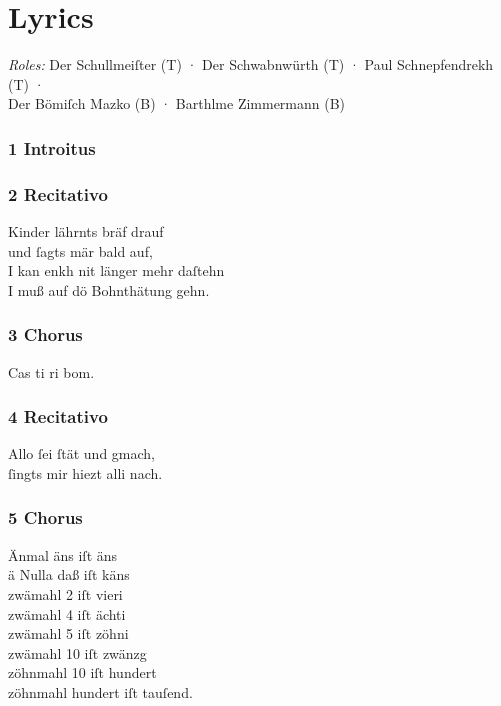 \documentclass{ees}
\newenvironment{lyrics}[1]{%
  \subsection{#1}\nopagebreak%
  \begin{lyricslist}%
  \let\voice\item%
}{%
  \end{lyricslist}%
}
\begin{document}
\cleardoublepage
\chapter{Lyrics}

\textit{Roles:} Der Schullmeiſter (T) · Der Schwabnwürth (T) · Paul Schnepfendrekh (T) · \\Der Bömiſch Mazko (B) · Barthlme Zimmermann (B)
\enlargethispage{2\baselineskip}

\subsection{1 Introitus}

\begin{lyrics}{2 Recitativo}
  \voice[Schullmeiſter]
  Kinder lährnts bräf drauf\\
  und ſagts mär bald auf,\\
  I kan enkh nit länger mehr daſtehn\\
  I muß auf dö Bohnthätung gehn.
\end{lyrics}

\begin{lyrics}{3 Chorus}
  \voice[alle]
  Cas ti ri bom.
\end{lyrics}

\begin{lyrics}{4 Recitativo}
  \voice[Schullmeiſter]
  Allo ſei ſtät und gmach,\\
  ſingts mir hiezt alli nach.
\end{lyrics}

\begin{lyrics}{5 Chorus}
  \voice[alle]
  Änmal äns iſt äns\\
  ä Nulla daß iſt käns\\
  zwämahl 2 iſt vieri\\
  zwämahl 4 iſt ächti\\
  zwämahl 5 iſt zöhni\\
  zwämahl 10 iſt zwänzg\\
  zöhnmahl 10 iſt hundert\\
  zöhnmahl hundert iſt tauſend.
\end{lyrics}
\end{document}
